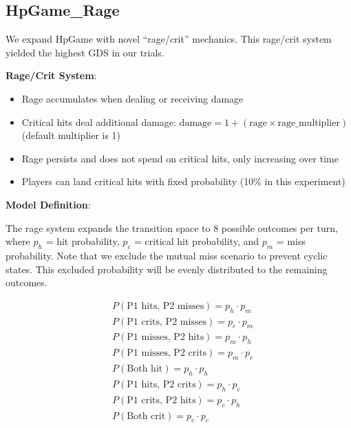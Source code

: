 \documentclass{article}
\begin{document}
\subsection{HpGame\_Rage}

We expand HpGame with novel ``rage/crit'' mechanics. This rage/crit system yielded the highest GDS in our trials.

\textbf{Rage/Crit System}: 
\begin{itemize}
\item Rage accumulates when dealing or receiving damage
\item Critical hits deal additional damage: $\text{damage} = 1 + (\text{rage} \times \text{rage\_multiplier})$ (default multiplier is 1)
\item Rage persists and does not spend on critical hits, only increasing over time
\item Players can land critical hits with fixed probability (10\% in this experiment)
\end{itemize}

\textbf{Model Definition}: 

The rage system expands the transition space to 8 possible outcomes per turn, where $p_h$ = hit probability, $p_c$ = critical hit probability, and $p_m$ = miss probability.
Note that we exclude the mutual miss scenario to prevent cyclic states.
This excluded probability will be evenly distributed to the remaining outcomes.

\begin{align}
&P(\text{P1 hits, P2 misses}) = p_h \cdot p_m \\
&P(\text{P1 crits, P2 misses}) = p_c \cdot p_m \\
&P(\text{P1 misses, P2 hits}) = p_m \cdot p_h \\
&P(\text{P1 misses, P2 crits}) = p_m \cdot p_c \\
&P(\text{Both hit}) = p_h \cdot p_h \\
&P(\text{P1 hits, P2 crits}) = p_h \cdot p_c \\
&P(\text{P1 crits, P2 hits}) = p_c \cdot p_h \\
&P(\text{Both crit}) = p_c \cdot p_c
\end{align}
\end{document}
